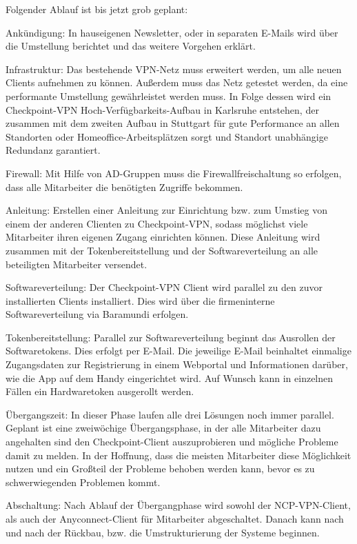 Folgender Ablauf ist bis jetzt grob geplant:
\begin{description}
  \item Ankündigung: In hauseigenen Newsletter, oder in separaten E-Mails wird über die Umstellung berichtet und das weitere Vorgehen erklärt.
  \item Infrastruktur: Das bestehende VPN-Netz muss erweitert werden, um alle neuen Clients aufnehmen zu können. Außerdem muss das Netz getestet werden, da eine performante Umstellung gewährleistet werden muss. In Folge dessen wird ein Checkpoint-VPN Hoch-Verfügbarkeits-Aufbau in Karlsruhe entstehen, der zusammen mit dem zweiten Aufbau in Stuttgart für gute Performance an allen Standorten oder Homeoffice-Arbeitsplätzen sorgt und Standort unabhängige Redundanz garantiert.
  \item Firewall: Mit Hilfe von AD-Gruppen muss die Firewallfreischaltung so erfolgen, dass alle Mitarbeiter die benötigten Zugriffe bekommen.
  \item Anleitung: Erstellen einer Anleitung zur Einrichtung bzw. zum Umstieg von einem der anderen Clienten zu Checkpoint-VPN, sodass möglichst viele Mitarbeiter ihren eigenen Zugang einrichten können. Diese Anleitung wird zusammen mit der Tokenbereitstellung und der Softwareverteilung an alle beteiligten Mitarbeiter versendet.
  \item Softwareverteilung: Der Checkpoint-VPN Client wird parallel zu den zuvor installierten Clients installiert. Dies wird über die firmeninterne Softwareverteilung via Baramundi erfolgen.
  \item Tokenbereitstellung: Parallel zur Softwareverteilung beginnt das Ausrollen der Softwaretokens. Dies erfolgt per E-Mail. Die jeweilige E-Mail beinhaltet einmalige Zugangsdaten zur Registrierung in einem Webportal und Informationen darüber, wie die App auf dem Handy eingerichtet wird. Auf Wunsch kann in einzelnen Fällen ein Hardwaretoken ausgerollt werden.
  \item Übergangszeit: In dieser Phase laufen alle drei Lösungen noch immer parallel. Geplant ist eine zweiwöchige Übergangsphase, in der alle Mitarbeiter dazu angehalten sind den Checkpoint-Client auszuprobieren und mögliche Probleme damit zu melden. In der Hoffnung, dass die meisten Mitarbeiter diese Möglichkeit nutzen und ein Großteil der Probleme behoben werden kann, bevor es zu schwerwiegenden Problemen kommt. 
  \item Abschaltung: Nach Ablauf der Übergangphase wird sowohl der NCP-VPN-Client, als auch der Anyconnect-Client für Mitarbeiter abgeschaltet. Danach kann nach und nach der Rückbau, bzw. die Umstrukturierung der Systeme beginnen.

\end{description}
